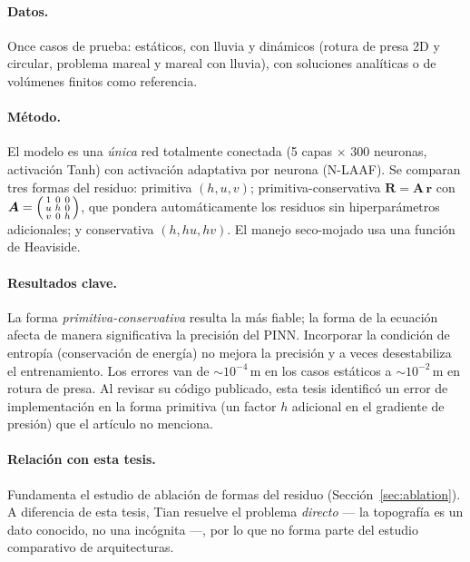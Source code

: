 \paragraph{Datos.}
Once casos de prueba: estáticos, con lluvia y dinámicos (rotura de presa 2D y
circular, problema mareal y mareal con lluvia), con soluciones analíticas o de
volúmenes finitos como referencia.

\paragraph{Método.}
El modelo es una \emph{única} red totalmente conectada (5 capas $\times$ 300
neuronas, activación Tanh) con activación adaptativa por neurona (N-LAAF). Se
comparan tres formas del residuo: primitiva $(h,u,v)$; primitiva-conservativa
$\bm{R} = \bm{A}\,\bm{r}$ con
$\bm{A} = \begin{psmallmatrix} 1 & 0 & 0 \\ u & h & 0 \\ v & 0 & h \end{psmallmatrix}$,
que pondera automáticamente los residuos sin hiperparámetros adicionales; y
conservativa $(h,hu,hv)$. El manejo seco-mojado usa una función de Heaviside.

\paragraph{Resultados clave.}
La forma \emph{primitiva-conservativa} resulta la más fiable; la forma de la
ecuación afecta de manera significativa la precisión del PINN. Incorporar la
condición de entropía (conservación de energía) no mejora la precisión y a veces
desestabiliza el entrenamiento. Los errores van de $\sim$$10^{-4}$\,m en los
casos estáticos a $\sim$$10^{-2}$\,m en rotura de presa. Al revisar su código
publicado, esta tesis identificó un error de implementación en la forma
primitiva (un factor $h$ adicional en el gradiente de presión) que el artículo
no menciona.

\paragraph{Relación con esta tesis.}
Fundamenta el estudio de ablación de formas del residuo
(Sección~\ref{sec:ablation}). A diferencia de esta tesis, Tian resuelve el
problema \emph{directo} --- la topografía es un dato conocido, no una incógnita
---, por lo que no forma parte del estudio comparativo de arquitecturas.

